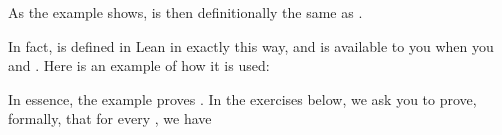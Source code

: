 \documentclass[letterpaper,10pt,english]{sphinxmanual}
\begin{document}
\sphinxAtStartPar
As the example shows,
 is then definitionally the same as .

\sphinxAtStartPar
In fact,  is defined in Lean in exactly this way,
and is available to you when you 
and .
Here is an example of how it is used:

\begin{sphinxVerbatim}[commandchars=\\\{\}]
  

        
  
      
          
\end{sphinxVerbatim}

\sphinxAtStartPar
In essence, the example proves .
In the exercises below, we ask you to prove,
formally, that for every ,
we have 
\end{document}
